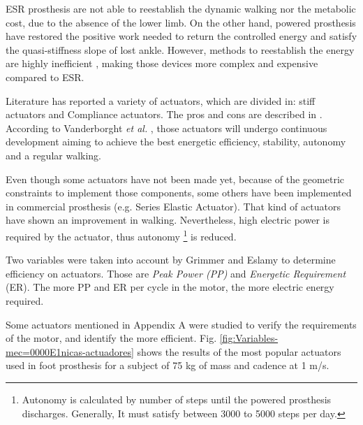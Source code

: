 \documentclass[12pt,english]{article}
\begin{document}
ESR prosthesis are not able to reestablish the dynamic walking nor the metabolic cost, due to the absence of the lower limb. On the other hand, powered prosthesis have restored the positive work needed to return the controlled energy and satisfy the quasi-stiffness slope \cite{hansen2014ankle, Eshraghi2013} of lost ankle. However, methods to reestablish the energy are highly inefficient \cite{Cherelle2014a}, making those devices more complex and expensive compared to ESR.  

Literature has reported a variety of actuators, which are divided in: stiff actuators and Compliance actuators. The pros and cons are described in . According to Vanderborght \emph{et al.} \cite{Vanderborght2013}, those actuators will undergo continuous development aiming to achieve the best energetic efficiency, stability, autonomy and a regular walking.

Even though some actuators have not been made yet, because of the geometric constraints to implement those components, some others have been implemented in commercial prosthesis (e.g. Series Elastic Actuator). That kind of actuators have shown an improvement in walking. Nevertheless, high electric power is required by the actuator, thus autonomy \footnote{Autonomy is calculated by number of steps until the powered prosthesis discharges. Generally, It must satisfy between 3000 to 5000 steps per day\cite{Grabowski2013}.} is reduced.      

Two variables were taken into account by Grimmer \cite{Grimmer2012, Grimmer2014} and Eslamy\cite{Eslamy2013, Eslamy2014} to determine efficiency on actuators. Those are \emph{Peak Power (PP)} and  \emph{Energetic Requirement} (ER). The more PP and ER per cycle in the motor, the more electric energy required. 

Some actuators mentioned in Appendix A were studied to verify the requirements of the motor, and identify the more efficient. Fig. \ref{fig:Variables-mec=0000E1nicas-actuadores} shows the results of the most popular actuators used in foot prosthesis for a subject of 75 kg of mass and cadence at 1 m/s.
\end{document}
